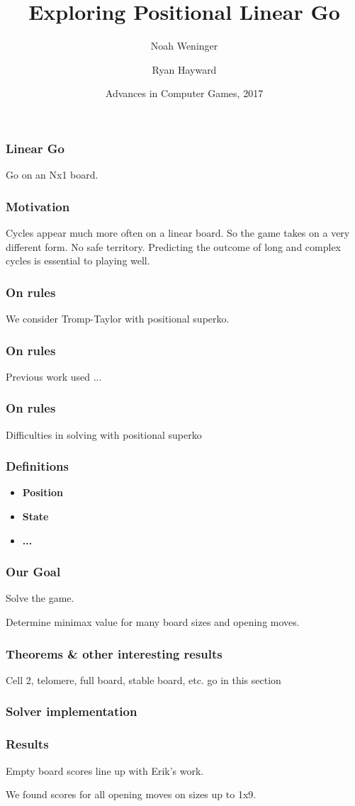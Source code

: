 \documentclass{beamer}
\title{Exploring Positional Linear Go}
\author[Weninger, Hayward]
{Noah Weninger \and Ryan Hayward}
\institute[University of Alberta]
{
  Department of Computing Science\\
  University of Alberta\\
  Canada
}
\date[ACG 2017]
{Advances in Computer Games, 2017}
\begin{document}
    \frame{\titlepage}

    \begin{frame}
        \frametitle{Linear Go}
        Go on an Nx1 board.
        \bigskip
        \begin{center}
            \showgoban[b2,k2]
        \end{center}
    \end{frame}

    \begin{frame}
        \frametitle{Motivation}
        Cycles appear much more often on a linear board. So the game takes on a very different form.
        No safe territory.
        Predicting the outcome of long and complex cycles is essential to playing well.
    \end{frame}

    \begin{frame}
        \frametitle{On rules}
        We consider Tromp-Taylor with positional superko.
    \end{frame}

    \begin{frame}
        \frametitle{On rules}
        Previous work used ...
    \end{frame}

    \begin{frame}
        \frametitle{On rules}
        Difficulties in solving with positional superko
    \end{frame}

    \begin{frame}
        \frametitle{Definitions}
        \begin{itemize}
            \item \textbf{Position}
            \item \textbf{State}
            \item \textbf{...}
        \end{itemize}
    \end{frame}

    \begin{frame}
        \frametitle{Our Goal}
        Solve the game.

        Determine minimax value for many board sizes and opening moves.
    \end{frame}


    \begin{frame}
        \frametitle{Theorems \& other interesting results}
        Cell 2, telomere, full board, stable board, etc. go in this section
    \end{frame}

    \begin{frame}
        \frametitle{Solver implementation}
    \end{frame}

    \begin{frame}
        \frametitle{Results}
        Empty board scores line up with Erik's work.

        We found scores for all opening moves on sizes up to 1x9.
    \end{frame}
\end{document}
